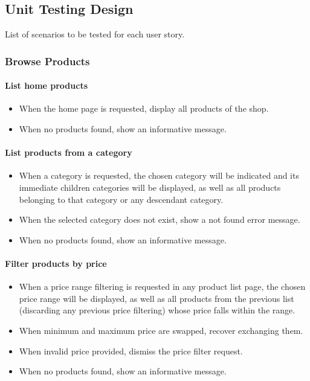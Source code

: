 \begin{appendices}
\section{Unit Testing Design}
List of scenarios to be tested for each user story.
 
\subsubsection{Browse Products}

\paragraph{List home products}
\begin{itemize}
	\item When the home page is requested, display all products of the shop.
	\item When no products found, show an informative message.
\end{itemize}

\paragraph{List products from a category}
\begin{itemize}
	\item When a category is requested, the chosen category will be indicated and its immediate children categories will be displayed, as well as all products belonging to that category or any descendant category.
	\item When the selected category does not exist, show a not found error message.
	\item When no products found, show an informative message.
\end{itemize}

\paragraph{Filter products by price}
\begin{itemize}
	\item When a price range filtering is requested in any product list page, the chosen price range will be displayed, as well as all products from the previous list (discarding any previous price filtering) whose price falls within the range.
	\item When minimum and maximum price are swapped, recover exchanging them.
	\item When invalid price provided, dismiss the price filter request.
	\item When no products found, show an informative message.
\end{itemize}


\end{appendices}
